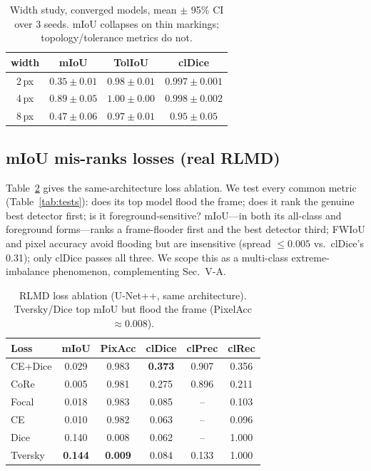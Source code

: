 \documentclass[10pt,twocolumn]{article}
\begin{document}
\begin{table}[t]\centering\small
\caption{Width study, converged models, mean $\pm$ 95\% CI over 3 seeds. mIoU
collapses on thin markings; topology/tolerance metrics do not.}
\label{tab:width}
\begin{tabular}{cccc}\toprule
width & mIoU & TolIoU & clDice \\\midrule
2\,px & $0.35\pm0.01$ & $0.98\pm0.01$ & $0.997\pm0.001$ \\
4\,px & $0.89\pm0.05$ & $1.00\pm0.00$ & $0.998\pm0.002$ \\
8\,px & $0.47\pm0.06$ & $0.97\pm0.01$ & $0.95\pm0.05$ \\\bottomrule
\end{tabular}
\end{table}

\subsection{mIoU mis-ranks losses (real RLMD)}
Table~\ref{tab:loss} gives the same-architecture loss ablation. We test every
common metric (Table~\ref{tab:tests}): does its top model flood the frame; does it
rank the genuine best detector first; is it foreground-sensitive? mIoU---in both
its all-class and foreground forms---ranks a frame-flooder first and the best
detector third; FWIoU and pixel accuracy avoid flooding but are insensitive
(spread $\le0.005$ vs.\ clDice's 0.31); only clDice passes all three. We scope this
as a multi-class extreme-imbalance phenomenon, complementing Sec.~V-A.

\begin{table}[t]\centering\small
\caption{RLMD loss ablation (U-Net++, same architecture). Tversky/Dice top mIoU
but flood the frame (PixelAcc $\approx 0.008$).}
\label{tab:loss}
\begin{tabular}{lccccc}\toprule
Loss & mIoU & PixAcc & clDice & clPrec & clRec \\\midrule
CE+Dice & 0.029 & 0.983 & \textbf{0.373} & 0.907 & 0.356 \\
CoRe & 0.005 & 0.981 & 0.275 & 0.896 & 0.211 \\
Focal & 0.018 & 0.983 & 0.085 & -- & 0.103 \\
CE & 0.010 & 0.982 & 0.063 & -- & 0.096 \\
Dice & 0.140 & 0.008 & 0.062 & -- & 1.000 \\
Tversky & \textbf{0.144} & \textbf{0.009} & 0.084 & 0.133 & 1.000 \\\bottomrule
\end{tabular}
\end{table}
\end{document}
